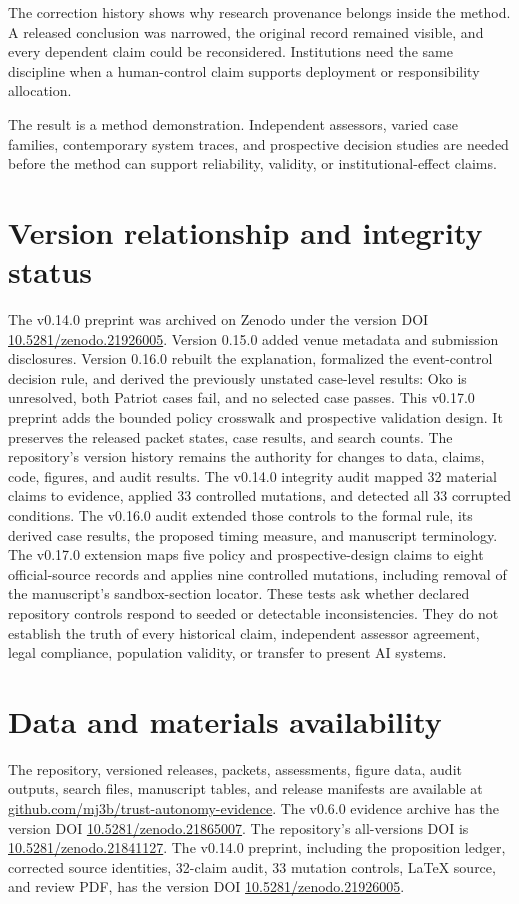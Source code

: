 \documentclass[11pt]{article}
\begin{document}
The correction history shows why research provenance belongs inside the method. A released conclusion was narrowed, the original record remained visible, and every dependent claim could be reconsidered. Institutions need the same discipline when a human-control claim supports deployment or responsibility allocation.

The result is a method demonstration. Independent assessors, varied case families, contemporary system traces, and prospective decision studies are needed before the method can support reliability, validity, or institutional-effect claims.
\FloatBarrier
\section*{Version relationship and integrity status}
The v0.14.0 preprint was archived on Zenodo under the version DOI \href{https://doi.org/10.5281/zenodo.21926005}{10.5281/zenodo.21926005}. Version 0.15.0 added venue metadata and submission disclosures. Version 0.16.0 rebuilt the explanation, formalized the event-control decision rule, and derived the previously unstated case-level results: Oko is unresolved, both Patriot cases fail, and no selected case passes. This v0.17.0 preprint adds the bounded policy crosswalk and prospective validation design. It preserves the released packet states, case results, and search counts. The repository's version history remains the authority for changes to data, claims, code, figures, and audit results.
The v0.14.0 integrity audit mapped 32 material claims to evidence, applied 33 controlled mutations, and detected all 33 corrupted conditions. The v0.16.0 audit extended those controls to the formal rule, its derived case results, the proposed timing measure, and manuscript terminology. The v0.17.0 extension maps five policy and prospective-design claims to eight official-source records and applies nine controlled mutations, including removal of the manuscript's sandbox-section locator. These tests ask whether declared repository controls respond to seeded or detectable inconsistencies. They do not establish the truth of every historical claim, independent assessor agreement, legal compliance, population validity, or transfer to present AI systems.
\FloatBarrier
\section*{Data and materials availability}
The repository, versioned releases, packets, assessments, figure data, audit outputs, search files, manuscript tables, and release manifests are available at \href{https://github.com/mj3b/trust-autonomy-evidence}{github.com/mj3b/trust-autonomy-evidence}. The v0.6.0 evidence archive has the version DOI \href{https://doi.org/10.5281/zenodo.21865007}{10.5281/zenodo.21865007}. The repository's all-versions DOI is \href{https://doi.org/10.5281/zenodo.21841127}{10.5281/zenodo.21841127}. The v0.14.0 preprint, including the proposition ledger, corrected source identities, 32-claim audit, 33 mutation controls, LaTeX source, and review PDF, has the version DOI \href{https://doi.org/10.5281/zenodo.21926005}{10.5281/zenodo.21926005}.
\FloatBarrier
\end{document}
